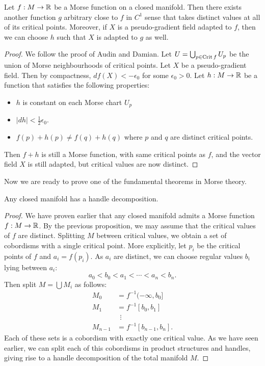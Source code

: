 \begin{prop}
    Let $f: M \to  \mathbb{R}$ be a Morse function on a closed manifold.
    Then there exists another function $g$ arbitrary close to $f$ in $C^{1}$ sense that takes distinct values at all of its critical points.
    Moreover, if $X$ is a pseudo-gradient field adapted to  $f$,
    then we can choose $h$ such that $X$ is adapted to $g$ as well.
\end{prop}
\begin{proof}
    We follow the proof of Audin and Damian.
    Let $U = \bigcup_{p \in \operatorname{Crit} f} U_p$ be the union of Morse neighbourhoods of critical points.
    Let $X$ be a pseudo-gradient field.
    Then by compactness, $df(X) < - \epsilon_0$ for some $\epsilon_0>0$.
    Let $h: M \to  \mathbb{R}$ be a function that satisfies the following properties:
    \begin{itemize}
        \item $h$ is constant on each Morse chart $U_p$
        \item $|dh| < \frac{1}{2}\epsilon_0$.
        \item $f(p) + h(p) \neq f(q) + h(q)$ where $p$ and  $q$ are distinct critical points.
    \end{itemize}
    Then $f + h$ is still a Morse function, with same critical points as  $f$, and the vector field $X$ is still adapted, but critical values are now distinct.
\end{proof}

Now we are ready to prove one of the fundamental theorems in Morse theory.

\begin{theorem}
    Any closed manifold has a handle decomposition.
\end{theorem}
\begin{proof}
    We have proven earlier that any closed manifold admits a Morse function $f: M \to  \mathbb{R}$.
    By the previous proposition, we may assume that the critical values of $f$ are distinct.
    Splitting $M$ between critical values, we obtain a set of cobordisms with a single critical point.
    More explicitly, let $p_i$ be the critical points of  $f$ and  $a_i = f(p_i)$.
    As $a_i$ are distinct, we can choose regular values $b_i$ lying between $a_i$:
     \[
    a_0 < b_0 < a_1 < \cdots < a_n < b_n
    .\] 
    Then split $M = \bigcup M_i$ as follows:
     \begin{align*}
         M_0 &= f^{-1}(-\infty, b_0]\\
         M_1 &= f^{-1}[b_0, b_1]\\
             &\ \:\vdots\\
         M_{n-1} &= f^{-1}[b_{n-1}, b_n]
    .\end{align*} 
    Each of these sets is a cobordism with exactly one critical value.
    As we have seen earlier, we can split each of this cobordisms in product structures and handles, giving rise to a handle decomposition of the total manifold $M$.
\end{proof}

